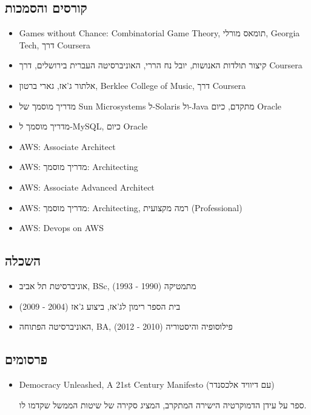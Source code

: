 \documentclass[
  hebrew,
]{article}
\providecommand{\tightlist}{%
  \setlength{\itemsep}{0pt}\setlength{\parskip}{0pt}}
\begin{document}
\subsection{קורסים
והסמכות}\label{ux5e7ux5d5ux5e8ux5e1ux5d9ux5dd-ux5d5ux5d4ux5e1ux5deux5dbux5d5ux5ea}

\begin{itemize}
\tightlist
\item
  Games without Chance: Combinatorial Game Theory, תומאס מורלי, Georgia
  Tech, דרך Coursera
\item
  קיצור תולדות האנושות, יובל נח הררי, האוניברסיטה העברית בירושלים, דרך
  Coursera
\item
  אלתור ג'אז, גארי ברטון, Berklee College of Music, דרך Coursera
\item
  מדריך מוסמך של Sun Microsystems ל-Solaris ול-Java מתקדם, כיום Oracle
\item
  מדריך מוסמך ל-MySQL, כיום Oracle
\item
  AWS: ‏Associate Architect
\item
  AWS: מדריך מוסמך: Architecting
\item
  AWS: ‏Associate Advanced Architect
\item
  AWS: מדריך מוסמך: Architecting, רמה מקצועית (Professional)
\item
  AWS: ‏Devops on AWS
\end{itemize}

\subsection{השכלה}\label{ux5d4ux5e9ux5dbux5dcux5d4}

\begin{itemize}
\tightlist
\item
  אוניברסיטת תל אביב, BSc, מתמטיקה (1990 - 1993)
\item
  בית הספר רימון לג'אז, ביצוע ג'אז (2004 - 2009)
\item
  האוניברסיטה הפתוחה, BA, פילוסופיה והיסטוריה (2010 - 2012)
\end{itemize}

\subsection{פרסומים}\label{ux5e4ux5e8ux5e1ux5d5ux5deux5d9ux5dd}

\begin{itemize}
\item
  Democracy Unleashed, A 21st Century Manifesto (עם דיוויד אלכסנדר)

  ספר על עידן הדמוקרטיה הישירה המתקרב, המציג סקירה של שיטות הממשל שקדמו
  לו.
\end{itemize}
\end{document}
